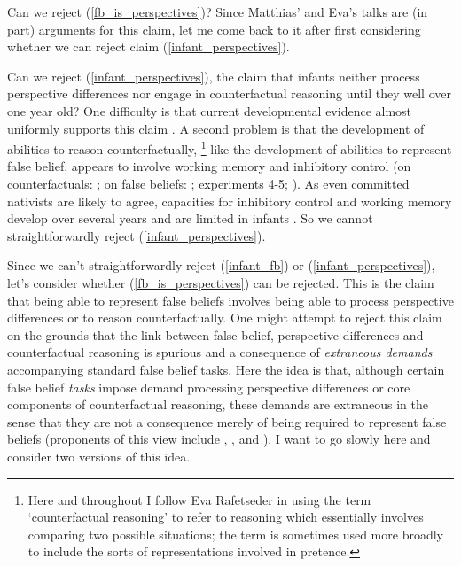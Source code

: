 \documentclass[12pt,\papersize]{extarticle}
\begin{document}
Can we reject (\ref{fb_is_perspectives})?
Since Matthias' and Eva's talks are (in part) arguments for this claim, let me come back to it after first considering whether we can reject 
claim (\ref{infant_perspectives}).

Can we reject (\ref{infant_perspectives}), the claim that infants neither process perspective differences nor engage in counterfactual reasoning until they well over one year old?
One difficulty is that current developmental evidence almost uniformly supports this claim  \citep{rafetseder:2010_counterfactual,beck:2011_almost}.
A second problem is that the development of abilities to reason counterfactually,%
\footnote{Here and throughout I follow Eva Rafetseder in using the term `counterfactual reasoning'  to refer to reasoning which essentially involves comparing two possible situations; the term is sometimes used more broadly to include the sorts of representations involved in pretence.} 
like the development of abilities to represent false belief,
appears to involve working memory and inhibitory control 
(on counterfactuals: 
	\citealp{drayton:2011_counterfactual,beck:2011_supporting};
on false beliefs: \citealp{en_1412, en_1698}; \citealp{lin:2010_reflexively, en_1547} experiments 4-5; \citealp{saxe_reading_2006}).
As even committed nativists are likely to agree, capacities for inhibitory control and working memory develop over several years and are limited in infants \citep[e.g.][]{carlson:2005_developmentally}.
So we cannot straightforwardly reject (\ref{infant_perspectives}).

Since we can't straightforwardly reject (\ref{infant_fb}) or (\ref{infant_perspectives}),
let's consider whether (\ref{fb_is_perspectives}) can be rejected.
This is the claim that being able to represent false beliefs involves being able to process perspective differences or to reason counterfactually.
One might attempt to reject this claim on the grounds that the link between false belief, perspective differences and counterfactual reasoning 
is spurious and a consequence of \emph{extraneous demands} accompanying standard false belief tasks.
Here the idea is that, although certain false belief \emph{tasks} impose demand processing perspective differences or core components of counterfactual reasoning,
these demands are extraneous in the sense that they are not a consequence merely of being required to represent false beliefs
(proponents of this view include 
	\citealp[p.\ 417]{Carpenter:2002gc},
	\citealp{Bloom:2000bt}, and
	\citealp{Leslie:1998nq}).
I want to go slowly here and consider two versions of this idea.
\end{document}
